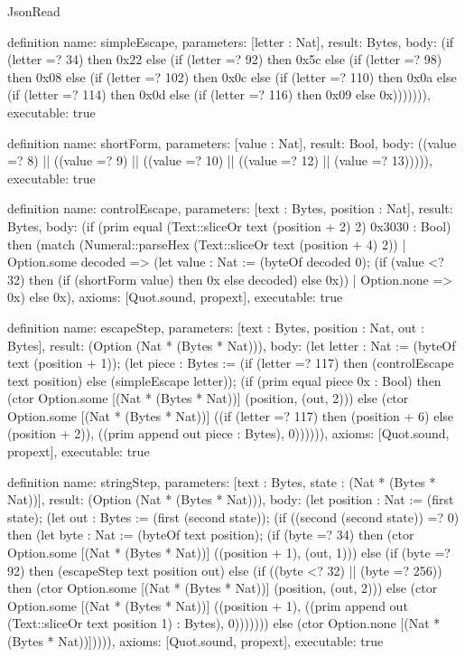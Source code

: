 \begin{lexlean}{JsonRead}
\begin{semanticmodule}
definition{
  name: simpleEscape,
  parameters: [letter : Nat],
  result: Bytes,
  body: (if (letter =? 34) then 0x22 else (if (letter =? 92) then 0x5c else (if (letter =? 98) then 0x08 else (if (letter =? 102) then 0x0c else (if (letter =? 110) then 0x0a else (if (letter =? 114) then 0x0d else (if (letter =? 116) then 0x09 else 0x))))))),
  executable: true
}

definition{
  name: shortForm,
  parameters: [value : Nat],
  result: Bool,
  body: ((value =? 8) || ((value =? 9) || ((value =? 10) || ((value =? 12) || (value =? 13))))),
  executable: true
}

definition{
  name: controlEscape,
  parameters: [text : Bytes, position : Nat],
  result: Bytes,
  body: (if (prim equal (Text::sliceOr text (position + 2) 2) 0x3030 : Bool) then (match (Numeral::parseHex (Text::sliceOr text (position + 4) 2))
    | Option.some decoded => (let value : Nat := (byteOf decoded 0); (if (value <? 32) then (if (shortForm value) then 0x else decoded) else 0x))
    | Option.none => 0x) else 0x),
  axioms: [Quot.sound, propext],
  executable: true
}

definition{
  name: escapeStep,
  parameters: [text : Bytes, position : Nat, out : Bytes],
  result: (Option (Nat * (Bytes * Nat))),
  body: (let letter : Nat := (byteOf text (position + 1)); (let piece : Bytes := (if (letter =? 117) then (controlEscape text position) else (simpleEscape letter)); (if (prim equal piece 0x : Bool) then (ctor Option.some [(Nat * (Bytes * Nat))] (position, (out, 2))) else (ctor Option.some [(Nat * (Bytes * Nat))] ((if (letter =? 117) then (position + 6) else (position + 2)), ((prim append out piece : Bytes), 0)))))),
  axioms: [Quot.sound, propext],
  executable: true
}

definition{
  name: stringStep,
  parameters: [text : Bytes, state : (Nat * (Bytes * Nat))],
  result: (Option (Nat * (Bytes * Nat))),
  body: (let position : Nat := (first state); (let out : Bytes := (first (second state)); (if ((second (second state)) =? 0) then (let byte : Nat := (byteOf text position); (if (byte =? 34) then (ctor Option.some [(Nat * (Bytes * Nat))] ((position + 1), (out, 1))) else (if (byte =? 92) then (escapeStep text position out) else (if ((byte <? 32) || (byte =? 256)) then (ctor Option.some [(Nat * (Bytes * Nat))] (position, (out, 2))) else (ctor Option.some [(Nat * (Bytes * Nat))] ((position + 1), ((prim append out (Text::sliceOr text position 1) : Bytes), 0))))))) else (ctor Option.none [(Nat * (Bytes * Nat))])))),
  axioms: [Quot.sound, propext],
  executable: true
}


\end{semanticmodule}
\end{lexlean}
